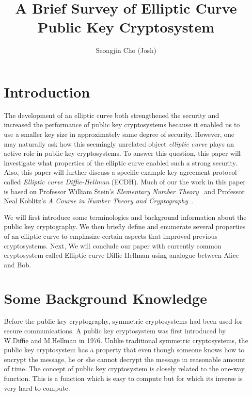 \documentclass[11pt]{article}
\begin{document}
\title{A Brief Survey of Elliptic Curve Public Key Cryptosystem}
\author{Seongjin Cho (Josh)}

\maketitle

\tableofcontents

\newpage

\section{Introduction}
The development of an elliptic curve both strengthened the security and increased the performance of public key cryptosystems because it enabled us to use a smaller key size in approximately same degree of security. However, one may naturally ask how this seemingly unrelated object \emph{elliptic curve} plays an active role in public key cryptosystems. To answer this question, this paper will investigate what properties of the elliptic curve enabled such a strong security. Also, this paper will further discuss a specific example key agreement protocol called \emph{Elliptic curve Diffie-Hellman} (ECDH). Much of our the work in this paper is based on Professor William Stein’s \emph{Elementary Number Theory}~\cite{Stein} and Professor Neal Koblitz's  \emph{A Course in Number Theory and Cryptography}~\cite{Neal}.

We will first introduce some terminologies and background information about the public key cryptography. We then briefly define and enumerate several properties of an elliptic curve to emphasize certain aspects that improved previous cryptosystems. Next, We will conclude our paper with currently common cryptosystem called Elliptic curve Diffie-Hellman using analogue between Alice and Bob.


\section{Some Background Knowledge}
Before the public key cryptography, symmetric cryptosystems had been used for secure communications. A public key cryptosystem was first introduced by W.Diffie and M.Hellman in 1976. Unlike traditional symmetric cryptosystems, the public key cryptosystem has a property that even though someone knows how to encrypt the message, he or she cannot decrypt the message in reasonable amount of time. The concept of public key cryptosystem is closely related to the one-way function. This is a function which is easy to compute but for which its inverse is very hard to compute.
\end{document}
